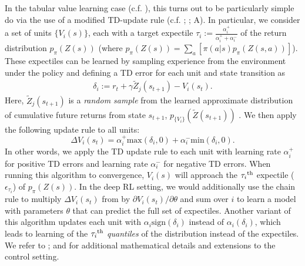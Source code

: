 In the tabular value learning case (c.f. ), this turns out to be particularly simple do via the use of a modified TD-update rule (c.f. ; \citealp{lowet2020distributional}; A).
In particular, we consider a set of units $\{ V_i(s) \}$, each with a target expectile $\tau_i := \frac{\alpha_i^+}{\alpha_i^+ + \alpha_i^-}$ of the return distribution $p_\pi(Z(s))$ (where $p_\pi(Z(s)) = \sum_a \left [ \pi(a|s) p_\pi(Z(s,a)) \right ] $).
These expectiles can be learned by sampling experience from the environment under the policy and defining a TD error for each unit and state transition as
\begin{align}
    \delta_i := r_t + \gamma \tilde{Z}_j(s_{t+1}) - V_i(s_t).
\end{align}
Here, $\tilde{Z}_j(s_{t+1})$ is a \emph{random sample} from the learned approximate distribution of cumulative future returns from state $s_{t+1}$, $p_{\{ V_i \} }(\tilde{Z}(s_{t+1}))$ \citep{lowet2020distributional,dabney2020distributional}.
We then apply the following update rule to all units:
\begin{equation}
    \label{eq:DRL_V_expec}
    \Delta V_i(s_t) = \alpha_i^+ \text{max}(\delta_i, 0 ) + \alpha_i^- \text{min}(\delta_i, 0).
\end{equation}
In other words, we apply the TD update rule to each unit with learning rate $\alpha_i^+$ for positive TD errors and learning rate $\alpha_i^-$ for negative TD errors.
When running this algorithm to convergence, $V_i(s)$ will approach the $\tau_i\textsuperscript{th}$ expectile ($\epsilon_{\tau_i}$) of $p_\pi(Z(s))$.
In the deep RL setting, we would additionally use the chain rule to multiply $\Delta V_i(s_t)$ from  by $\partial V_i(s_t) / \partial \theta$ and sum over $i$ to learn a model with parameters $\theta$ that can predict the full set of expectiles.
Another variant of this algorithm updates each unit with $\alpha_i \text{sign}(\delta_i)$ instead of $\alpha_i (\delta_i)$, which leads to learning of the $\tau_i\textsuperscript{th}$ \emph{quantiles} of the distribution instead of the expectiles.
We refer to \citet{bellemare2017distributional,dabney2018distributional,rowland2019statistics,bellemare2023distributional}; and \citet{dabney2020distributional} for additional mathematical details and extensions to the control setting.



